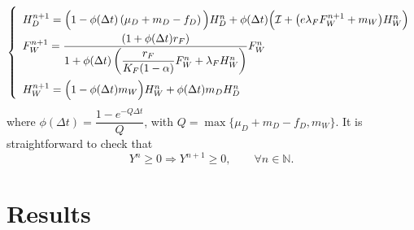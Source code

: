 \documentclass{article}
\newcommand{\cI}{\mathcal{I}}
\begin{document}
\begin{equation}
\def\arraystretch{2}
\left\{ \begin{array}{l}
H_{D}^{n+1}=\Big(1-\phi(\Delta t) \left(\mu_{D}+m_{D}-f_{D}\right)\Big)H_{D}^{n}+ \phi(\Delta t)\Big(\cI+ \big(e\lambda_{F}F_{W}^{n+1} + m_{W}\big)H_{W}^{n}\Big)\\
F_{W}^{n+1}=\dfrac{\left(1+\phi(\Delta t)r_{F}\right)}{1+\phi(\Delta t)\left(\dfrac{r_{F}}{K_{F}(1-\alpha)}F_{W}^{n}+\lambda_{F}H_{W}^{n}\right)}F_{W}^{n}\\ 
H_{W}^{n+1}=\Big(1-\phi(\Delta t)m_{W}\Big)H_{W}^n+\phi(\Delta t)m_{D}H_{D}^n
\end{array}\right.
\end{equation}
where $\phi(\Delta t)=\dfrac{1-e^{-Q\Delta t}}{Q}$, with $Q=\max\{\mu_D+m_D-f_D,m_W\}$. 
It is straightforward to check that
$$
Y^n \geq 0 \Rightarrow Y^{n+1}\geq 0,\qquad \forall n\in \mathbb{N}.
$$

\section{Results}



\end{document}

